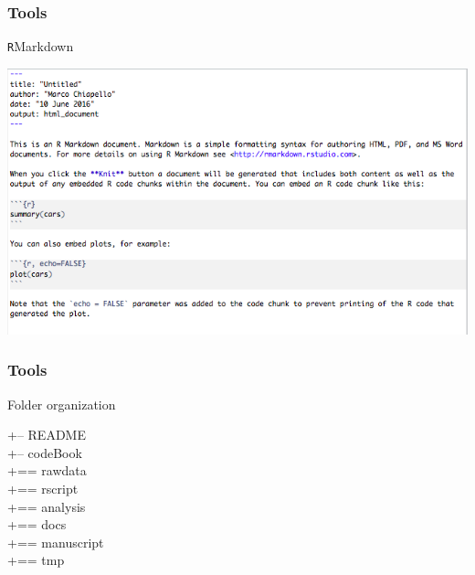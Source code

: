 \documentclass{beamer}
\begin{document}
\begin{frame}
\frametitle{Tools}
\begin{center}\Large\texttt{R}Markdown\end{center}
\begin{center}\includegraphics[scale=0.45]{figures/RMarkdown.png}\end{center}
\end{frame}
\begin{frame}
\frametitle{Tools}
\begin{center}\Large{\sc Folder organization}\end{center}
+-- README\\
+-- codeBook\\
+== rawdata\\
+== rscript\\
+== analysis\\
+== docs\\
+== manuscript\\
+== tmp
\end{frame}
\end{document}
